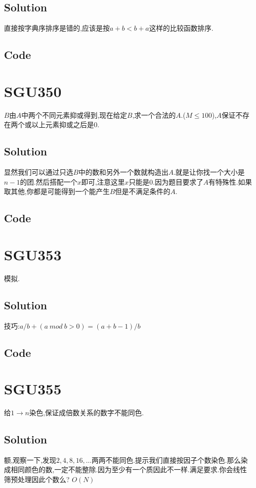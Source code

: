 \documentclass{article}
\newcommand{\includecode}[2][c]{}
\begin{document}
\begin{flushleft}
\subsection{Solution}
直接按字典序排序是错的,应该是按$a+b<b+a$这样的比较函数排序.
\subsection{Code}
\includecode[C++]{347.cc}

\section{SGU350}
$B$由$A$中两个不同元素抑或得到,现在给定$B$,求一个合法的$A$.($M \leq 100$),$A$保证不存在两个或以上元素抑或之后是0.
\subsection{Solution}
显然我们可以通过只选$B$中的数和另外一个数就构造出$A$.就是让你找一个大小是$n-1$的团.然后搭配一个$x$即可,注意这里$x$只能是0.因为题目要求了$A$有特殊性.如果取其他,你都是可能得到一个能产生$B$但是不满足条件的$A$.
\subsection{Code}
\includecode[C++]{350.cc}

\section{SGU353}
模拟.
\subsection{Solution}
技巧:${a/b + (a\ mod\ b > 0) = (a + b - 1) / b}$
\subsection{Code}
\includecode[C++]{353.cc}

\section{SGU355}
给$1 \rightarrow n$染色,保证成倍数关系的数字不能同色.
\subsection{Solution}
额,观察一下,发现$2,4,8,16,\dots$两两不能同色.提示我们直接按因子个数染色.那么染成相同颜色的数,一定不能整除.因为至少有一个质因此不一样.满足要求.你会线性筛预处理因此个数么? $O(N)$

\end{flushleft}
\end{document}
